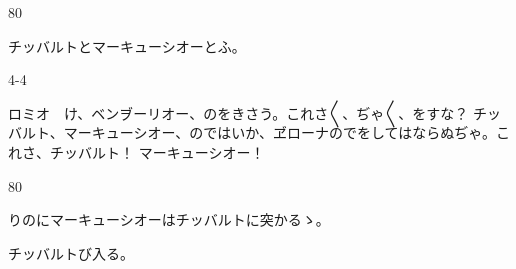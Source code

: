 \documentclass[tate,paper=b6j,jafontsize=9pt]{jlreq}
\begin{document}
\begin{azconvIndented}{8\zw}{0\zw}

チッバルトとマーキューシオーとふ。

\end{azconvIndented}
\begin{azconvIndented}{4\zw}{-4\zw}

ロミオ　け、ベンヺーリオー、のをきさう。これさ{〳〵}、ぢゃ{〳〵}、をすな？ チッバルト、マーキューシオー、のではいか、ヹローナのでをしてはならぬぢゃ。これさ、チッバルト！ マーキューシオー！

\end{azconvIndented}
\begin{azconvIndented}{8\zw}{0\zw}

りのにマーキューシオーはチッバルトに突かるゝ。

チッバルトび入る。

\end{azconvIndented}
\end{document}

